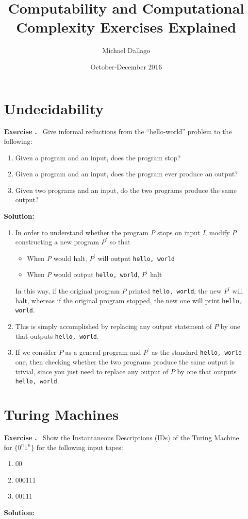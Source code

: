 \documentclass[titlepage]{article}
\title{Computability and Computational Complexity Exercises Explained}
\author{Michael Dallago}
\date{October-December 2016}
\newcounter{exercise}
\newcounter{solution}
\newcommand\Exercise{%
	\stepcounter{exercise}%
	\textbf{Exercise \theexercise.}~%
	\setcounter{solution}{0}%
}
\newcommand\TheSolution{%
	\textbf{Solution:}\\%
}
\begin{document}
\maketitle

\section{Undecidability}
\Exercise  Give informal reductions from the “hello-world” problem to the following:
\begin{enumerate}
	\item Given a program and an input, does the program stop?
	\item Given a program and an input, does the program ever produce an
	output?
	\item Given two programs and an input, do the two programs produce the
	same output?
\end{enumerate}

\TheSolution \begin{enumerate}
	\item In order to understand whether the program \textit{P} stops on input \textit{I}, modify \textit{P} constructing a new program $P^\prime$ so that
	\begin{itemize}
		\item When \textit{P} would halt, $P^\prime$ will output \texttt{hello, world}
		\item When \textit{P} would output \texttt{hello, world}, $P^\prime$ halt
	\end{itemize}
	In this way, if the original program $P$ printed \texttt{hello, world}, the new $P^\prime$ will halt, whereas if the original program stopped, the new one will print \texttt{hello, world}.
	
	\item This is simply accomplished by replacing any output statement of $P$ by one that outputs \texttt{hello, world}. 
	
	\item If we consider $ P $ as a general program and $ P^\prime $ as the standard \texttt{hello, world} one, then checking whether the two programs produce the same output is trivial, since you just need to replace any output of $ P $ by one that outputs \texttt{hello, world}.
\end{enumerate}

\clearpage

\section{Turing Machines}

\setcounter{exercise}{0}
\Exercise Show the Instantaneous Descriptions (IDs) of the Turing Machine for $ \{0^{n}1^{n}\} $ for the following input tapes:
\begin{enumerate}
	\item 00
	\item 000111
	\item 00111
\end{enumerate}

\TheSolution
\end{document}
